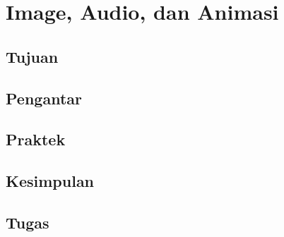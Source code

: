 \chapter{Image, Audio, dan Animasi}

\section{Tujuan}



\section{Pengantar}

\section{Praktek}

\section{Kesimpulan}

\section{Tugas}